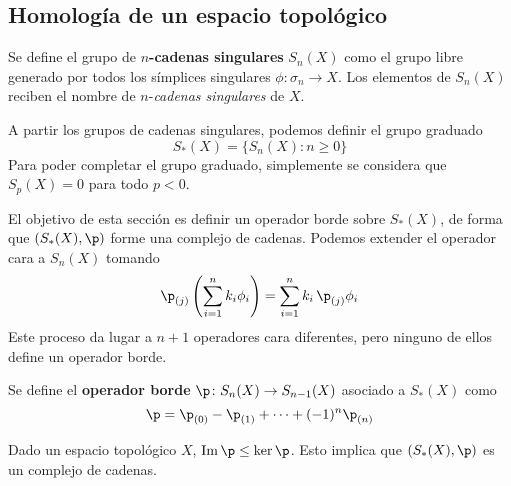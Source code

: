 \subsection{Homología de un espacio topológico}
\begin{definition}
	Se define el grupo de \textbf{$n$-cadenas singulares} $S_n(X)$ como el grupo libre generado por todos los símplices singulares $\phi\colon \sigma_n \to X$.
	Los elementos de $S_n(X)$ reciben el nombre de $n$-\emph{cadenas singulares} de $X$.
\end{definition}

A partir los grupos de cadenas singulares, podemos definir el grupo graduado
	\[S_*(X)=\{S_n(X): n \geq 0\}\]
Para poder completar el grupo graduado, simplemente se considera que $S_p(X)=0$ para todo $p < 0$.

El objetivo de esta sección es definir un operador borde sobre $S_*(X)$, de forma que $(S_*(X),\p)$ forme una complejo de cadenas.
Podemos extender el operador cara a $S_n(X)$ tomando
	\[\p_{(j)}\left(\sum_{i=1}^n k_i\phi_i\right)= \sum^n_{i=1}k_i\,\p_{(j)}\phi_i\]
Este proceso da lugar a $n+1$ operadores cara diferentes, pero ninguno de ellos define un operador borde.

\begin{definition}
	Se define el \textbf{operador borde} $\p\colon S_n(X) \to S_{n-1}(X)$ asociado a $S_*(X)$ como
		\[\p=\p_{(0)}-\p_{(1)}+\dots+(-1)^n\p_{(n)}\]
\end{definition}

\begin{theorem}
Dado un espacio topológico $X$, $\im \p \leq \ker \p$.
Esto implica que $(S_*(X), \p)$ es un complejo de cadenas.
\end{theorem}

